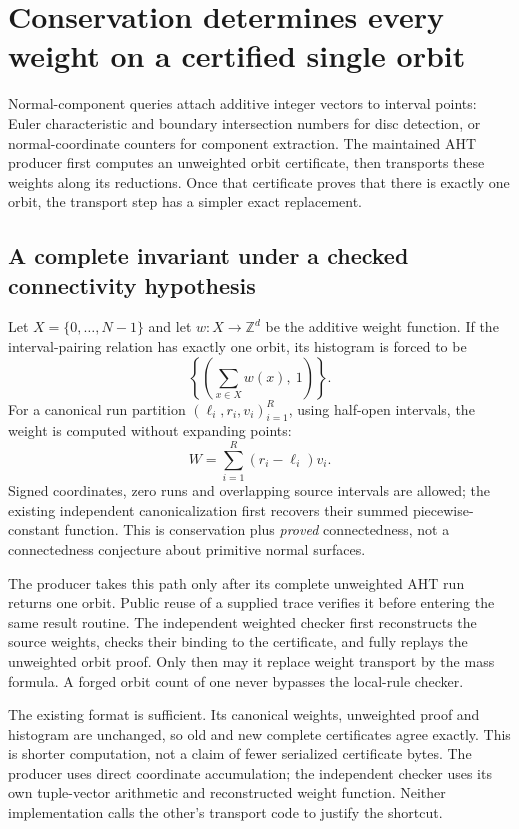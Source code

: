 \section{Conservation determines every weight on a certified single orbit}
\label{sec:single-orbit-weights}

Normal-component queries attach additive integer vectors to interval points:
Euler characteristic and boundary intersection numbers for disc detection,
or normal-coordinate counters for component extraction. The maintained AHT
producer first computes an unweighted orbit certificate, then transports
these weights along its reductions. Once that certificate proves that there
is exactly one orbit, the transport step has a simpler exact replacement.

\subsection{A complete invariant under a checked connectivity hypothesis}

Let $X=\{0,\ldots,N-1\}$ and let $w:X\to\mathbb Z^d$ be the additive
weight function. If the interval-pairing relation has exactly one orbit,
its histogram is forced to be
\[
 \left\{\left(\sum_{x\in X}w(x),\ 1\right)\right\}.
\]
For a canonical run partition $(\ell_i,r_i,v_i)_{i=1}^R$, using half-open
intervals, the weight is computed without expanding points:
\[
 W=\sum_{i=1}^R (r_i-\ell_i)v_i.
\]
Signed coordinates, zero runs and overlapping source intervals are allowed;
the existing independent canonicalization first recovers their summed
piecewise-constant function. This is conservation plus \emph{proved}
connectedness, not a connectedness conjecture about primitive normal surfaces.

The producer takes this path only after its complete unweighted AHT run
returns one orbit. Public reuse of a supplied trace verifies it before
entering the same result routine. The independent weighted checker first
reconstructs the source weights, checks their binding to the certificate,
and fully replays the unweighted orbit proof. Only then may it replace
weight transport by the mass formula. A forged orbit count of one never
bypasses the local-rule checker.

The existing  format is sufficient. Its
canonical weights, unweighted proof and histogram are unchanged, so old and
new complete certificates agree exactly. This is shorter computation, not
a claim of fewer serialized certificate bytes. The producer uses direct
coordinate accumulation; the independent checker uses its own tuple-vector
arithmetic and reconstructed weight function. Neither implementation calls
the other's transport code to justify the shortcut.

